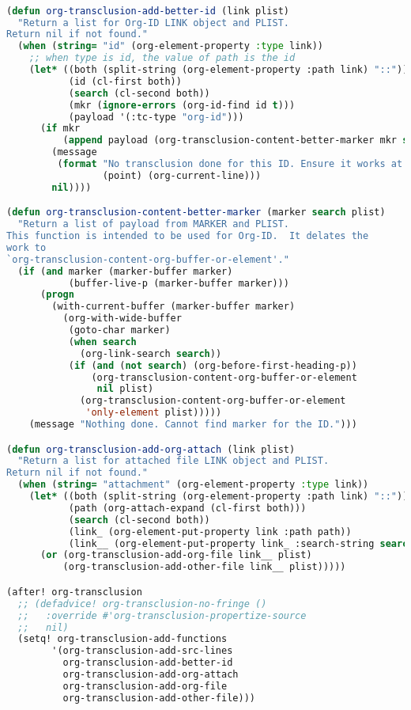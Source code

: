 \documentclass[11pt]{article}
\begin{document}
\begin{enumerate}
\begin{lstlisting}[language=Lisp]%! Someone please complete this list for me

(defun org-transclusion-add-better-id (link plist)
  "Return a list for Org-ID LINK object and PLIST.
Return nil if not found."
  (when (string= "id" (org-element-property :type link))
    ;; when type is id, the value of path is the id
    (let* ((both (split-string (org-element-property :path link) "::"))
           (id (cl-first both))
           (search (cl-second both))
           (mkr (ignore-errors (org-id-find id t)))
           (payload '(:tc-type "org-id")))
      (if mkr
          (append payload (org-transclusion-content-better-marker mkr search plist))
        (message
         (format "No transclusion done for this ID. Ensure it works at point %d, line %d"
                 (point) (org-current-line)))
        nil))))

(defun org-transclusion-content-better-marker (marker search plist)
  "Return a list of payload from MARKER and PLIST.
This function is intended to be used for Org-ID.  It delates the
work to
`org-transclusion-content-org-buffer-or-element'."
  (if (and marker (marker-buffer marker)
           (buffer-live-p (marker-buffer marker)))
      (progn
        (with-current-buffer (marker-buffer marker)
          (org-with-wide-buffer
           (goto-char marker)
           (when search
             (org-link-search search))
           (if (and (not search) (org-before-first-heading-p))
               (org-transclusion-content-org-buffer-or-element
                nil plist)
             (org-transclusion-content-org-buffer-or-element
              'only-element plist)))))
    (message "Nothing done. Cannot find marker for the ID.")))

(defun org-transclusion-add-org-attach (link plist)
  "Return a list for attached file LINK object and PLIST.
Return nil if not found."
  (when (string= "attachment" (org-element-property :type link))
    (let* ((both (split-string (org-element-property :path link) "::"))
           (path (org-attach-expand (cl-first both)))
           (search (cl-second both))
           (link_ (org-element-put-property link :path path))
           (link__ (org-element-put-property link_ :search-string search)))
      (or (org-transclusion-add-org-file link__ plist)
          (org-transclusion-add-other-file link__ plist)))))

(after! org-transclusion
  ;; (defadvice! org-transclusion-no-fringe ()
  ;;   :override #'org-transclusion-propertize-source
  ;;   nil)
  (setq! org-transclusion-add-functions
        '(org-transclusion-add-src-lines
          org-transclusion-add-better-id
          org-transclusion-add-org-attach
          org-transclusion-add-org-file
          org-transclusion-add-other-file)))
\end{lstlisting}
\end{enumerate}
\end{document}

